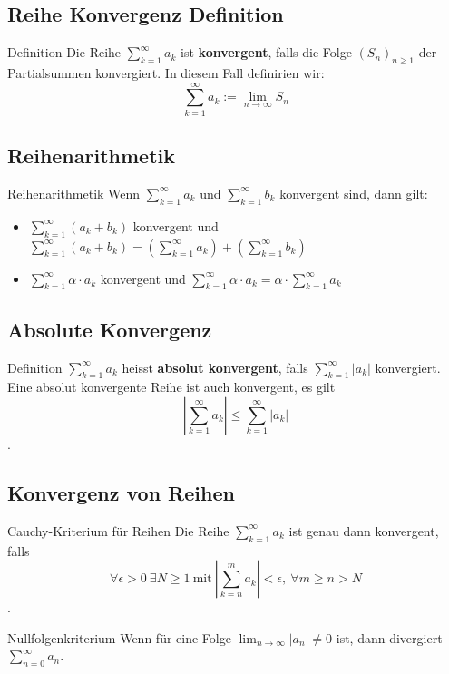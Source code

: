 \documentclass[a4paper,8pt]{extarticle}
\def\limn{\lim_{n\to \infty}}
\def\sumk{\sum_{k=1}^\infty}
\def\sumn{\sum_{n=0}^\infty}
\begin{document}
\subsection{Reihe Konvergenz Definition}
\begin{mainbox}{Definition}
  Die Reihe $\sum_{k=1}^\infty a_k$ ist \textbf{konvergent}, falls die Folge $(S_n)_{n \geq 1}$ der Partialsummen konvergiert. In diesem Fall definirien wir: $$\sum_{k=1}^\infty a_k := \lim_{n\to \infty} S_n$$
\end{mainbox}

\subsection{Reihenarithmetik}
\begin{subbox}{Reihenarithmetik}
Wenn $\sumk a_k$ und $\sumk b_k$ konvergent sind, dann gilt:
\begin{itemize}
 \item $\sumk (a_k + b_k)$ konvergent und $\sumk (a_k + b_k) = \left( \sumk a_k \right) + \left( \sumk b_k \right)$
 \item $\sumk \alpha \cdot a_k$ konvergent und $\sumk \alpha \cdot a_k = \alpha \cdot \sumk a_k$
\end{itemize}
\end{subbox}

\subsection{Absolute Konvergenz}
\begin{subbox}{Definition}
$\sumk a_k$ heisst \textbf{absolut konvergent}, falls $\sumk |a_k|$ konvergiert. Eine absolut konvergente Reihe ist auch konvergent, es gilt $$|\sumk a_k| \le \sumk |a_k|$$.
\end{subbox}


\subsection{Konvergenz von Reihen}

\begin{mainbox}{Cauchy-Kriterium für Reihen}
Die Reihe $\sumk a_k$ ist genau dann konvergent, falls $$\forall \epsilon > 0 \ \exists N \ge 1 \ \text{mit} \ | \sum_{k=n}^m a_k | < \epsilon, \ \forall m \ge n > N$$.
\end{mainbox}

\begin{mainbox}{Nullfolgenkriterium}
 Wenn für eine Folge $\limn |a_n| \ne 0$ ist, dann divergiert $\sumn a_n$.
\end{mainbox}
\end{document}
